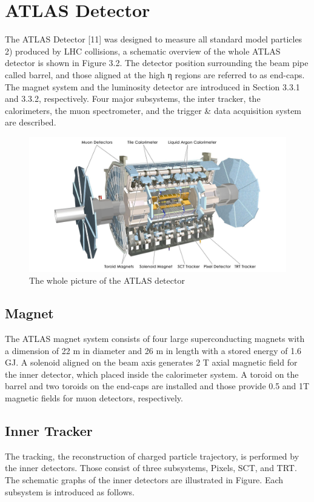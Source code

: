 \section{ATLAS Detector}
The ATLAS Detector [11] was designed to measure all standard model particles 2) produced by LHC collisions, a schematic overview of the whole ATLAS detector is shown in Figure 3.2. The detector position surrounding the beam pipe called barrel, and those aligned at the high η regions are referred to as end-caps.
The magnet system and the luminosity detector are introduced in Section 3.3.1 and 3.3.2, respectively. Four major subsystems, the inter tracker, the calorimeters, the muon spectrometer, and the trigger & data acquisition system are described.
\begin{figure}[tbp]
\begin{center}
 \includegraphics[width=1.0\textwidth,keepaspectratio]{figures/detector/ATLAS}
\caption{
The whole picture of the ATLAS detector
}
\label{fig:CERN}
\end{center}
\end{figure}

\subsection{Magnet}
The ATLAS magnet system consists of four large superconducting magnets with a dimension of 22 m in diameter and 26 m in length with a stored energy of 1.6 GJ. A solenoid aligned on the beam axis generates 2 T axial magnetic field for the inner detector, which placed inside the calorimeter system. A toroid on the barrel and two toroids on the end-caps are installed and those provide 0.5 and 1T magnetic fields for muon detectors, respectively.
\subsection{Inner Tracker}
The tracking, the reconstruction of charged particle trajectory, is performed by the inner detectors. Those consist of three subsystems, Pixels, SCT, and TRT. The schematic graphs of the inner detectors are illustrated in Figure. Each subsystem is introduced as follows.
